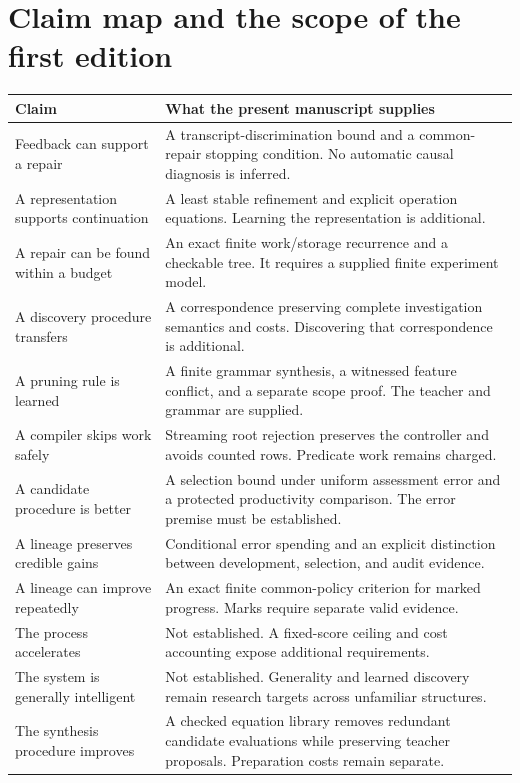 \documentclass[11pt,letterpaper]{article}
\theoremstyle{plain}
\theoremstyle{definition}
\begin{document}
\section{Claim map and the scope of the first edition}\label{app:claimmap}
\begin{small}\begin{longtable}{@{}p{}p{}@{}}\toprule
Claim & What the present manuscript supplies\\\midrule\endhead
Feedback can support a repair & A transcript-discrimination bound and a common-repair stopping condition. No automatic causal diagnosis is inferred.\\
A representation supports continuation & A least stable refinement and explicit operation equations. Learning the representation is additional.\\
A repair can be found within a budget & An exact finite work/storage recurrence and a checkable tree. It requires a supplied finite experiment model.\\
A discovery procedure transfers & A correspondence preserving complete investigation semantics and costs. Discovering that correspondence is additional.\\
A pruning rule is learned & A finite grammar synthesis, a witnessed feature conflict, and a separate scope proof. The teacher and grammar are supplied.\\
A compiler skips work safely & Streaming root rejection preserves the controller and avoids counted rows. Predicate work remains charged.\\
A candidate procedure is better & A selection bound under uniform assessment error and a protected productivity comparison. The error premise must be established.\\
A lineage preserves credible gains & Conditional error spending and an explicit distinction between development, selection, and audit evidence.\\
A lineage can improve repeatedly & An exact finite common-policy criterion for marked progress. Marks require separate valid evidence.\\
The process accelerates & Not established. A fixed-score ceiling and cost accounting expose additional requirements.\\
The system is generally intelligent & Not established. Generality and learned discovery remain research targets across unfamiliar structures.\\The synthesis procedure improves & A checked equation library removes redundant candidate evaluations while preserving teacher proposals. Preparation costs remain separate.\\

\end{longtable}
\end{small}
\end{document}
